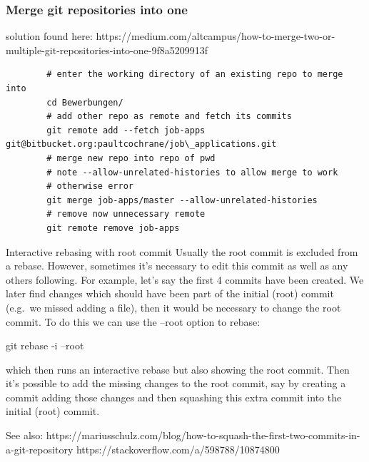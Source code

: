 

\begin{frame}[fragile]
    \frametitle{Merge git repositories into one}

solution found here: https://medium.com/altcampus/how-to-merge-two-or-multiple-git-repositories-into-one-9f8a5209913f
    \begin{verbatim}
        # enter the working directory of an existing repo to merge into
        cd Bewerbungen/
        # add other repo as remote and fetch its commits
        git remote add --fetch job-apps git@bitbucket.org:paultcochrane/job\_applications.git
        # merge new repo into repo of pwd
        # note --allow-unrelated-histories to allow merge to work
        # otherwise error
        git merge job-apps/master --allow-unrelated-histories
        # remove now unnecessary remote
        git remote remove job-apps
    \end{verbatim}

\end{frame}

\begin{frame}{Interactive rebasing with root commit}
    Usually the root commit is excluded from a rebase.  However, sometimes
    it's necessary to edit this commit as well as any others following.  For
    example, let's say the first 4 commits have been created.  We later find
    changes which should have been part of the initial (root) commit (e.g.\ we
    missed adding a file), then it would be necessary to change the root
    commit.  To do this we can use the --root option to rebase:

    git rebase -i --root

    which then runs an interactive rebase but also showing the root commit.
    Then it's possible to add the missing changes to the root commit, say by
    creating a commit adding those changes and then squashing this extra
    commit into the initial (root) commit.

    See also:
    https://mariusschulz.com/blog/how-to-squash-the-first-two-commits-in-a-git-repository
    https://stackoverflow.com/a/598788/10874800
\end{frame}

